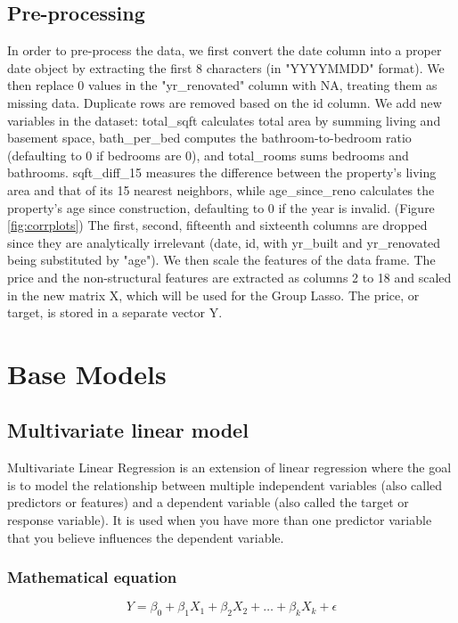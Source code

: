 \documentclass[a4paper, 9pt]{article}
\begin{document}
\begin{multicols}{2}
\subsection{Pre-processing} \vspace{-3pt}
In order to pre-process the data, we first convert the date column into a proper date object by extracting the first 8 characters (in "YYYYMMDD" format). We then replace 0 values in the "yr{\_}renovated" column with NA, treating them as missing data. Duplicate rows are removed based on the id column.
We add new variables in the dataset: total{\_}sqft calculates total area by summing living and basement space, bath{\_}per{\_}bed computes the bathroom-to-bedroom ratio (defaulting to 0 if bedrooms are 0), and total{\_}rooms sums bedrooms and bathrooms. sqft{\_}diff{\_}15 measures the difference between the property’s living area and that of its 15 nearest neighbors, while age{\_}since{\_}reno calculates the property’s age since construction, defaulting to 0 if the year is invalid. (Figure \ref{fig:corrplots})
The first, second, fifteenth and sixteenth columns are dropped since they are analytically irrelevant (date, id, with yr{\_}built and yr{\_}renovated being substituted by "age"). We then scale the features of the data frame.
The price and the non-structural features are extracted as columns 2 to 18 and scaled in the new matrix X, which will be used for the Group Lasso. The price, or target, is stored in a separate vector Y.

\section{Base Models} \vspace{-7pt}
\subsection{Multivariate linear model} \vspace{-3pt}
Multivariate Linear Regression is an extension of linear regression where the goal is to model the relationship between multiple independent variables (also called predictors or features) and a dependent variable (also called the target or response variable). It is used when you have more than one predictor variable that you believe influences the dependent variable.

\subsubsection*{Mathematical equation}
\begin{equation}
Y=\beta_0+\beta_1X_1+\beta_2X_2+\dots+\beta_kX_k+\epsilon
\end{equation}


\end{multicols}
\end{document}

